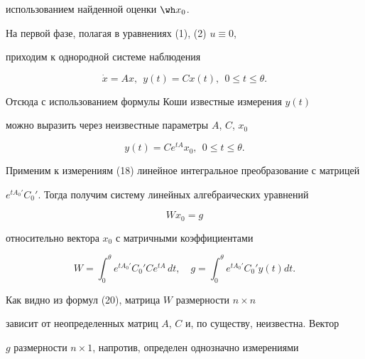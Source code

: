 использованием найденной оценки $\wh x_0$.





На первой фазе, полагая в уравнениях (1), (2) $ u \equiv 0$,


приходим к однородной системе наблюдения


\begin{equation}


\Dot x = Ax, \ \ y(t)=Cx(t), \ \  0 \le t \le \theta.


\end{equation}


Отсюда с использованием формулы Коши известные измерения $y(t)$


можно выразить через неизвестные параметры $A$, $C$, $x_0$


\begin{equation}


y(t)= C e^{tA} x_0, \ \ 0 \le t \le \theta.


\end{equation}





Применим к измерениям (18) линейное интегральное преобразование с матрицей


$e^{tA_0'} C_0'$. Тогда получим систему линейных алгебраических уравнений


\begin{equation}


W x_0 = g


\end{equation}


относительно вектора $x_0$ с матричными коэффициентами


\begin{equation}


W = \int_0^{\theta} e^{t A_0'} C_0' C e^{ t A} \, d t,\quad


g = \int_0^{\theta} e^{t A_0'} C_0' y(t) d t.


\end{equation}





Как видно из формул (20), матрица $W$ размерности $n \times n$


зависит от неопределенных матриц $A$, $C$ и, по существу, неизвестна. Вектор


$g$ размерности $n \times 1$, напротив, определен однозначно измерениями


